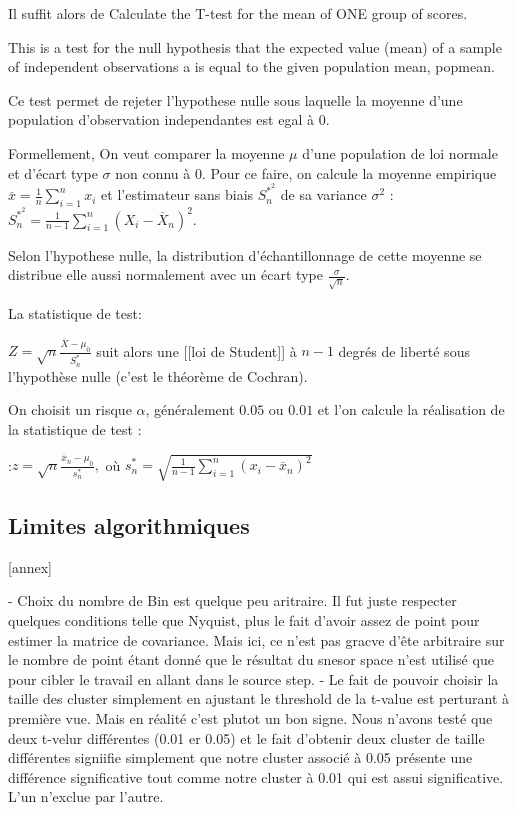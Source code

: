Il suffit alors de Calculate the T-test for the mean of ONE group of scores.

This is a test for the null hypothesis that the expected value (mean) of a sample of independent observations a is equal to the given population mean, popmean.

Ce test permet de rejeter l'hypothese nulle sous laquelle la moyenne d'une population d'observation independantes est egal à $0$.

Formellement,
On veut comparer la moyenne $\mu$ d'une population de loi normale et d’écart type $\sigma$ non connu à $0$. Pour ce faire, on calcule la moyenne empirique $\overline{x} = \frac{1}{n}\sum_{i=1}^{n}x_i$ et l'estimateur  sans biais $S^{\ast ^2}_n$ de sa variance $\sigma^2$
:$S^{\ast ^2}_n = \frac{1}{n-1}\sum\limits_{i=1}^n (X_i - \overline X_n )^2$.

Selon l’hypothese nulle, la distribution d’échantillonnage de cette moyenne se distribue elle aussi normalement avec un écart type $\frac{\sigma}{\sqrt{n}}$.

La statistique de test:

$ Z = \sqrt{n}\frac{\overline{X} - \mu_0}{S^{\ast}_n}$
suit alors une [[loi de Student]] à $n-1$ degrés de liberté sous l'hypothèse nulle (c'est le théorème de Cochran).

On choisit un risque $\alpha$, généralement $0.05$ ou $0.01$ et l'on calcule la réalisation de la statistique de test :

:$z = \sqrt{n}\frac{\overline{x}_n - \mu_0}{s^{\ast}_n},$ où $s^{\ast}_n =\sqrt{\frac{1}{n-1}\sum\limits_{i=1}^n (x_i - \overline x_n )^2} $




\subsection{Limites algorithmiques}
[annex]

- Choix du nombre de Bin est quelque peu aritraire. Il fut juste respecter quelques conditions telle que Nyquist, plus le fait d'avoir assez de point pour estimer la matrice de covariance. Mais ici, ce n'est pas gracve d'ête arbitraire sur le nombre de point étant donné que le résultat du snesor space n'est utilisé que pour cibler le travail en allant dans le source step.
- Le fait de pouvoir choisir la taille des cluster simplement en ajustant le threshold de la t-value est perturant à première vue. Mais en réalité c'est plutot un bon signe. Nous n'avons testé que deux t-velur différentes (0.01 er 0.05) et le fait d'obtenir deux cluster de taille différentes signiifie simplement que notre cluster associé à 0.05 présente une différence significative tout comme notre cluster à 0.01 qui est assui significative. L'un n'exclue par l'autre.


